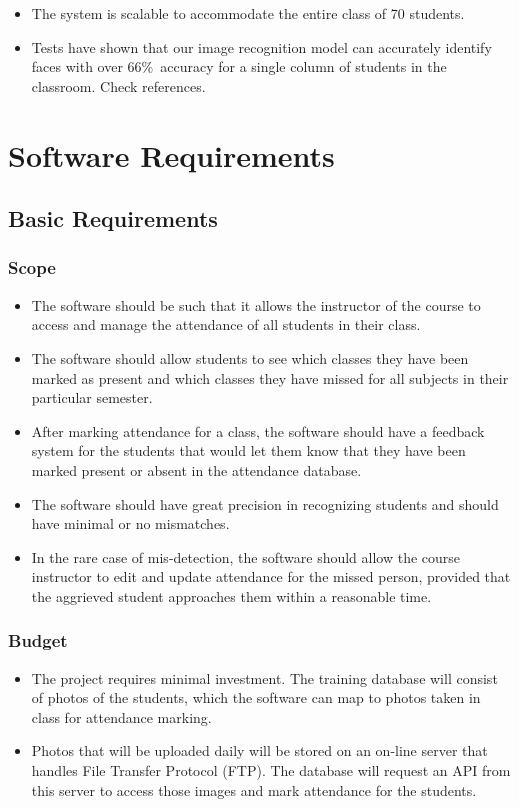 \documentclass[a4paper,12pt]{article}
\begin{document}
\begin{itemize}
    \item The system is scalable to accommodate the entire class of 70 students.
    \item Tests have shown that our image recognition model can accurately identify faces with over 66\%\ accuracy for a single column of students in the classroom. Check references.
\end{itemize}

\section{Software Requirements}
\subsection{Basic Requirements}
\subsubsection{Scope}
\begin{itemize}
    \item The software should be such that it allows the instructor of the course to access and manage the attendance of all students in their class. 
    \item The software should allow students to see which classes they have been marked as present and which classes they have missed for all subjects in their particular semester.
    \item After marking attendance for a class, the software should have a feedback system for the students that would let them know that they have been marked present or absent in the attendance database.
    \item The software should have great precision in recognizing students and should have minimal or no mismatches.
    \item In the rare case of mis-detection, the software should allow the course instructor to edit and update attendance for the missed person, provided that the aggrieved student approaches them within a reasonable time.
\end{itemize}

\subsubsection{Budget}
\begin{itemize}
    \item The project requires minimal investment. The training database will consist of photos of the students, which the software can map to photos taken in class for attendance marking. 
    \item Photos that will be uploaded daily will be stored on an on-line server that handles File Transfer Protocol (FTP). The database will request an API from this server to access those images and mark attendance for the students.
\end{itemize}
\end{document}
